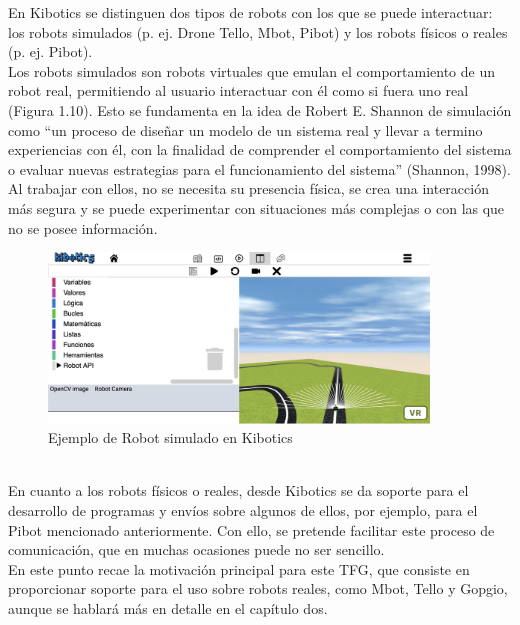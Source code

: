 \documentclass{report}
\begin{document}
En Kibotics se distinguen dos tipos de robots con los que se puede interactuar: los robots simulados (p. ej. Drone Tello, Mbot, Pibot) y los robots físicos o reales (p. ej. Pibot).
\\

Los robots simulados son robots virtuales que emulan el comportamiento de un robot real, permitiendo al usuario interactuar con él como si fuera uno real (Figura 1.10). Esto se fundamenta en la idea de Robert E. Shannon de simulación como “un proceso de diseñar un modelo de un sistema real y llevar a termino experiencias con él, con la finalidad de comprender el comportamiento del sistema o evaluar nuevas estrategias para el funcionamiento del sistema” (Shannon, 1998).  Al trabajar con ellos, no se necesita su presencia física, se crea una interacción más segura y se puede experimentar con situaciones más complejas o con las que no se posee información.
\\
\begin{figure}[h!]
  \centering
    \includegraphics[width=0.9\textwidth]{images/simulado.png}
  \caption{Ejemplo de Robot simulado en Kibotics}
  \label{Ejemplo de Robot simulado en Kibotics}
\end{figure}
\\

En cuanto a los robots físicos o reales, desde Kibotics se da soporte para el desarrollo de programas y envíos sobre algunos de ellos, por ejemplo, para el Pibot mencionado anteriormente. Con ello, se pretende facilitar este proceso de comunicación, que en muchas ocasiones puede no ser sencillo.
\\

En este punto recae la motivación principal para este TFG, que consiste en proporcionar soporte para el uso sobre robots reales, como Mbot, Tello y Gopgio, aunque se hablará más en detalle en el capítulo dos.


\end{document}

